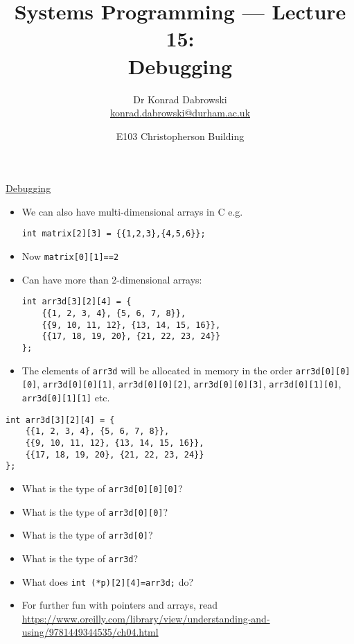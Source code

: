 \documentclass{article}
\title{Systems Programming --- Lecture 15:\\
Debugging}
\author{Dr Konrad Dabrowski\\
\href{mailto://konrad.dabrowski@durham.ac.uk}{konrad.dabrowski@durham.ac.uk}
}
\date{E103 Christopherson Building}
\begin{document}
\begin{center}
	\underline{\huge Debugging}
\end{center}




\begin{itemize}
\item We can also have multi-dimensional arrays in C e.g.
\begin{verbatim}
int matrix[2][3] = {{1,2,3},{4,5,6}};
\end{verbatim}
\item Now \verb!matrix[0][1]==2!
\item Can have more than 2-dimensional arrays:
\begin{verbatim}
int arr3d[3][2][4] = {
    {{1, 2, 3, 4}, {5, 6, 7, 8}},
    {{9, 10, 11, 12}, {13, 14, 15, 16}},
    {{17, 18, 19, 20}, {21, 22, 23, 24}}
};
\end{verbatim}
\item The elements of \verb!arr3d! will be allocated in memory in the order \verb!arr3d[0][0][0]!,  \verb!arr3d[0][0][1]!,  \verb!arr3d[0][0][2]!,  \verb!arr3d[0][0][3]!,  \verb!arr3d[0][1][0]!,  \verb!arr3d[0][1][1]! etc.
\end{itemize}



\begin{verbatim}
int arr3d[3][2][4] = {
    {{1, 2, 3, 4}, {5, 6, 7, 8}},
    {{9, 10, 11, 12}, {13, 14, 15, 16}},
    {{17, 18, 19, 20}, {21, 22, 23, 24}}
};
\end{verbatim}
\begin{itemize}
\item What is the type of \verb!arr3d[0][0][0]!?
\item What is the type of \verb!arr3d[0][0]!?
\item What is the type of \verb!arr3d[0]!?
\item What is the type of \verb!arr3d!?
\item What does \verb!int (*p)[2][4]=arr3d;! do?
\item For further fun with pointers and arrays, read \url{https://www.oreilly.com/library/view/understanding-and-using/9781449344535/ch04.html}
\end{itemize}
\end{document}
